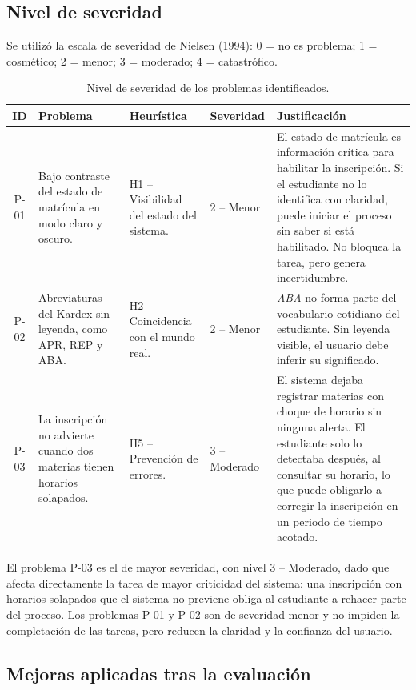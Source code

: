 \subsection{Nivel de severidad}

Se utilizó la escala de severidad de Nielsen (1994): 0 = no es problema; 1 = cosmético; 2 = menor; 3 = moderado; 4 = catastrófico.

\renewcommand{\arraystretch}{1.35}
\begin{table}[H]
\centering
\small
\begin{tabularx}{\textwidth}{|c|p{2.6cm}|p{2.6cm}|l|X|}
\hline
\textbf{ID} & \textbf{Problema} & \textbf{Heurística} & \textbf{Severidad} & \textbf{Justificación} \\
\hline
P-01 & Bajo contraste del estado de matrícula en modo claro y oscuro. & H1 -- Visibilidad del estado del sistema. & 2 -- Menor & El estado de matrícula es información crítica para habilitar la inscripción. Si el estudiante no lo identifica con claridad, puede iniciar el proceso sin saber si está habilitado. No bloquea la tarea, pero genera incertidumbre. \\
\hline
P-02 & Abreviaturas del Kardex sin leyenda, como APR, REP y ABA. & H2 -- Coincidencia con el mundo real. & 2 -- Menor & \textit{ABA} no forma parte del vocabulario cotidiano del estudiante. Sin leyenda visible, el usuario debe inferir su significado. \\
\hline
P-03 & La inscripción no advierte cuando dos materias tienen horarios solapados. & H5 -- Prevención de errores. & 3 -- Moderado & El sistema dejaba registrar materias con choque de horario sin ninguna alerta. El estudiante solo lo detectaba después, al consultar su horario, lo que puede obligarlo a corregir la inscripción en un periodo de tiempo acotado. \\
\hline
\end{tabularx}
\caption{Nivel de severidad de los problemas identificados.}\label{tab:eval-severidad}
\end{table}
\renewcommand{\arraystretch}{1}

El problema P-03 es el de mayor severidad, con nivel 3 -- Moderado, dado que afecta directamente la tarea de mayor criticidad del sistema: una inscripción con horarios solapados que el sistema no previene obliga al estudiante a rehacer parte del proceso. Los problemas P-01 y P-02 son de severidad menor y no impiden la completación de las tareas, pero reducen la claridad y la confianza del usuario.

\subsection{Mejoras aplicadas tras la evaluación}

